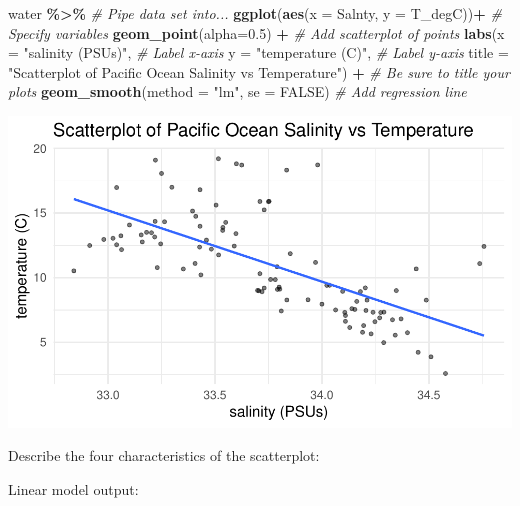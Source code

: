 \documentclass[
]{report}
\newenvironment{Shaded}{\begin{snugshade}}{\end{snugshade}}
\newcommand{\AttributeTok}[1]{\textcolor[rgb]{0.13,0.29,0.53}{#1}}
\newcommand{\CommentTok}[1]{\textcolor[rgb]{0.56,0.35,0.01}{\textit{#1}}}
\newcommand{\ConstantTok}[1]{\textcolor[rgb]{0.56,0.35,0.01}{#1}}
\newcommand{\DecValTok}[1]{\textcolor[rgb]{0.00,0.00,0.81}{#1}}
\newcommand{\FloatTok}[1]{\textcolor[rgb]{0.00,0.00,0.81}{#1}}
\newcommand{\FunctionTok}[1]{\textcolor[rgb]{0.13,0.29,0.53}{\textbf{#1}}}
\newcommand{\NormalTok}[1]{#1}
\newcommand{\OtherTok}[1]{\textcolor[rgb]{0.56,0.35,0.01}{#1}}
\newcommand{\SpecialCharTok}[1]{\textcolor[rgb]{0.81,0.36,0.00}{\textbf{#1}}}
\newcommand{\StringTok}[1]{\textcolor[rgb]{0.31,0.60,0.02}{#1}}
\begin{document}
\begin{Shaded}
\begin{Highlighting}[]
\NormalTok{water }\SpecialCharTok{\%\textgreater{}\%} \CommentTok{\# Pipe data set into...}
\FunctionTok{ggplot}\NormalTok{(}\FunctionTok{aes}\NormalTok{(}\AttributeTok{x =}\NormalTok{ Salnty, }\AttributeTok{y =}\NormalTok{ T\_degC))}\SpecialCharTok{+}  \CommentTok{\# Specify variables}
  \FunctionTok{geom\_point}\NormalTok{(}\AttributeTok{alpha=}\FloatTok{0.5}\NormalTok{) }\SpecialCharTok{+}  \CommentTok{\# Add scatterplot of points}
  \FunctionTok{labs}\NormalTok{(}\AttributeTok{x =} \StringTok{"salinity (PSUs)"}\NormalTok{,  }\CommentTok{\# Label x{-}axis}
       \AttributeTok{y =} \StringTok{"temperature (C)"}\NormalTok{,  }\CommentTok{\# Label y{-}axis}
       \AttributeTok{title =} \StringTok{"Scatterplot of Pacific Ocean Salinity vs Temperature"}\NormalTok{) }\SpecialCharTok{+} 
               \CommentTok{\# Be sure to title your plots}
  \FunctionTok{geom\_smooth}\NormalTok{(}\AttributeTok{method =} \StringTok{"lm"}\NormalTok{, }\AttributeTok{se =} \ConstantTok{FALSE}\NormalTok{)  }\CommentTok{\# Add regression line}
\end{Highlighting}
\end{Shaded}

\begin{center}\includegraphics[width=0.7\linewidth]{13-LN013-regression_files/figure-latex/unnamed-chunk-2-1} \end{center}

Describe the four characteristics of the scatterplot:

\vspace{1in}

Linear model output:

\begin{Shaded}
\end{Shaded}
\end{document}
